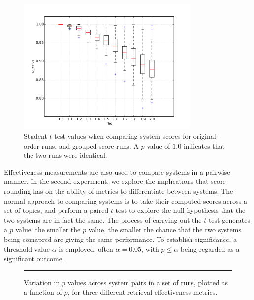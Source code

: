 \begin{figure}[t]
\centering
\includegraphics[width=0.8\textwidth]{figs/rho-p-value.pdf}
\caption{Student $t$-test values when comparing system scores for
original-order runs, and grouped-score runs.
A $p$ value of $1.0$ indicates that the two runs were identical.
\label{fig-rho-p-value}}
\end{figure}


Effectiveness measurements are also used to compare systems in a
pairwise manner.
In the second experiment, we explore the implications that score
rounding has on the ability of metrics to differentiate between
systems.
The normal approach to comparing systems is to take their computed
scores across a set of topics, and perform a paired $t$-test to
explore the null hypothesis that the two systems are in fact the
same.
The process of carrying out the $t$-test generates a $p$ value; the
smaller the $p$ value, the smaller the chance that the two systems
being comapred are giving the same performance.
To establish significance, a threshold value $\alpha$ is employed,
often $\alpha=0.05$, with $p\le\alpha$ being regarded as a
significant outcome.

\begin{figure}[t]
\centering
\rule{0.5mm}{45mm}
\caption{Variation in $p$ values across system pairs in a set
of runs, plotted as a function of $\rho$, for three different
retrieval effectiveness metrics.
{}
{}
{}
\label{fig-pair-variation}}
\end{figure}

